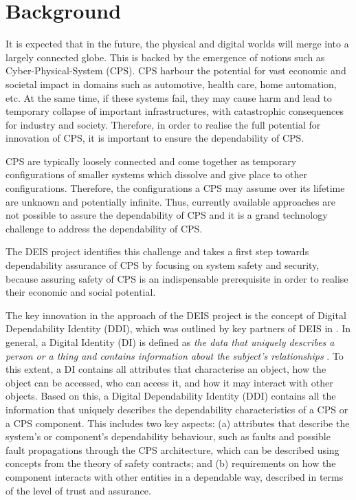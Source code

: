 \section{Background}
It is expected that in the future, the physical and digital worlds will merge into a largely connected globe. This is backed by the emergence of notions such as Cyber-Physical-System (CPS). 
CPS harbour the potential for vast economic and societal impact in domains such as automotive, health care, home automation, etc. At the same time, if these systems fail, they may cause harm and lead to temporary collapse of important infrastructures, with catastrophic consequences for industry and society. 
Therefore, in order to realise the full potential for innovation of CPS, it is important to ensure the dependability of CPS.

CPS are typically loosely connected and come together as temporary configurations of smaller systems which dissolve and give place to other configurations. Therefore, the configurations a CPS may assume over its lifetime are unknown and potentially infinite. Thus, currently available approaches are not possible to assure the dependability of CPS and it is a grand technology challenge to address the dependability of CPS. 

The DEIS project identifies this challenge and takes a first step towards dependability assurance of CPS by focusing on system safety and security, because assuring safety of CPS is an indispensable prerequisite in order to realise their economic and social potential.

The key innovation in the approach of the DEIS project is the concept of Digital Dependability Identity (DDI), which was outlined by key partners of DEIS in \cite{}. 
In general, a Digital Identity (DI) is defined as \emph{the data that uniquely describes a person or a thing and contains information about the subject's relationships} \cite{}. 
To this extent, a DI contains all attributes that characterise an object, how the object can be accessed, who can access it, and how it may interact with other objects. Based on this, a Digital Dependability Identity (DDI) contains all the information that uniquely describes the dependability characteristics of a CPS or a CPS component. This includes two key aspects: (a) attributes that describe the system’s or component’s dependability behaviour, such as faults and possible fault propagations through the CPS architecture, which can be described using concepts from the theory of safety contracts; and (b) requirements on how the component interacts with other entities in a dependable way, described in terms of the level of trust and assurance.

